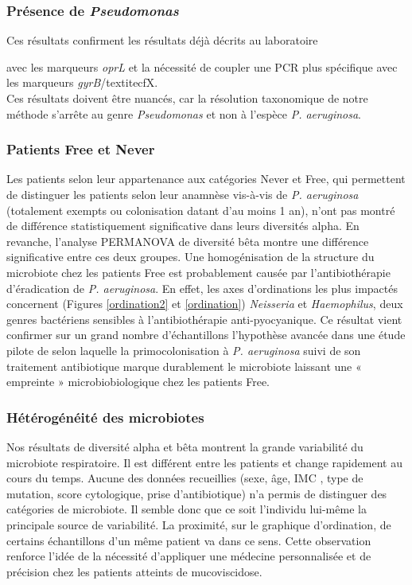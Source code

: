 \documentclass[12pt,a4paper]{article}
\begin{document}
{\subsubsection{Présence de \textit{Pseudomonas}}

Ces résultats confirment les résultats déjà décrits au laboratoire{\cite{LeGall} avec les marqueurs \textit{oprL} et la nécessité de coupler une PCR plus spécifique avec les marqueurs \textit{gyrB}/textit{ecfX}. \\
Ces résultats doivent être nuancés, car la résolution taxonomique de notre méthode s'arrête au genre \textit{Pseudomonas} et non à l'espèce \textit{P. aeruginosa}.

\subsubsection{Patients Free et Never}
Les patients selon leur appartenance aux catégories Never et Free\cite{Lee2003}, qui permettent de distinguer les patients selon leur anamnèse vis-à-vis de \textit{P. aeruginosa} (totalement exempts ou colonisation datant d'au moins 1 an), n'ont pas montré de différence statistiquement significative dans leurs diversités alpha. En revanche, l'analyse PERMANOVA de diversité bêta montre une différence significative entre ces deux groupes. Une homogénisation de la structure du microbiote chez les patients Free est probablement causée par l'antibiothérapie d'éradication de \textit{P. aeruginosa}. En effet,  les axes d'ordinations les plus impactés concernent (Figures \ref{ordination2} et \ref{ordination}) \textit{Neisseria} et \textit{Haemophilus}, deux genres bactériens sensibles à l'antibiothérapie anti-pyocyanique. Ce résultat vient confirmer sur un grand nombre d'échantillons l'hypothèse avancée dans une étude pilote de \cite{Keravec2015} selon laquelle la primocolonisation à \textit{P. aeruginosa} suivi de son traitement antibiotique marque durablement le microbiote laissant une « empreinte » microbiobiologique chez les patients Free.
 
\subsubsection{Hétérogénéité des microbiotes}
Nos résultats de diversité alpha et bêta montrent la grande variabilité du microbiote respiratoire. Il est différent entre les patients et change rapidement au cours du temps. Aucune des données recueillies (sexe, âge, IMC , type de mutation, score cytologique, prise d'antibiotique) n'a permis de distinguer des catégories de microbiote. Il semble donc que ce soit l'individu lui-même la principale source de variabilité. La proximité, sur le graphique d'ordination, de certains échantillons d'un même patient va dans ce sens. Cette observation renforce l'idée de la nécessité d'appliquer une médecine personnalisée et de précision chez les patients atteints de mucoviscidose.

}}
\end{document}
